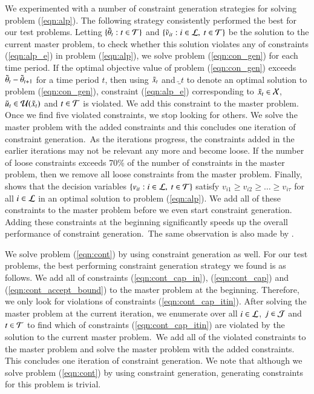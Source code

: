 We experimented with a number of constraint generation strategies for solving problem (\ref{eqn:alp}). The following strategy consistently performed the best for our test problems. Letting $\{ {\tilde \theta}_t : t \in {\cal T}\}$ and $\{{\tilde v}_{it} : i \in {\cal L},~ t \in {\cal T}\}$ be the solution to the current master problem, to check whether this solution violates any of constraints (\ref{eqn:alp_e}) in problem (\ref{eqn:alp}), we solve problem (\ref{eqn:con_gen}) for each time period. If the optimal objective value of problem (\ref{eqn:con_gen}) exceeds ${\tilde \theta}_t - {\tilde \theta}_{t+1}$ for a time period $t$, then using ${\tilde x}_t$ and $\utilde_t$ to denote an optimal solution to problem (\ref{eqn:con_gen}), constraint (\ref{eqn:alp_e}) corresponding to ${\tilde x}_t \in {\cal X}$, ${\tilde u}_t \in {\cal U}({\tilde x}_t)$ and $t \in {\cal T}$ is violated. We add this constraint to the master problem. Once we find five violated constraints, we stop looking for others. We solve the master problem with the added constraints and this concludes one iteration of constraint generation.~As the iterations progress, the constraints added in the earlier iterations may not be relevant any more and become loose. If the number of loose constraints exceeds 70\% of the number of constraints in the master problem, then we remove all loose constraints from the master problem.  Finally,  shows that the decision variables $\{ v_{it} : i \in {\cal L},~t \in {\cal T}\}$ satisfy $v_{i1} \geq v_{i2} \geq \ldots \geq v_{i\tau}$ for all $i \in {\cal L}$ in an optimal solution to problem \mbox{(\ref{eqn:alp})}. We add all of these constraints to the master problem before we even start constraint generation. Adding these constraints at the beginning significantly speeds up the overall performance of constraint generation.~The same observation is also made by .


We solve problem (\ref{eqn:cont}) by using constraint generation as well. For our test problems, the best performing constraint generation strategy we found is as follows. We add all of constraints (\ref{eqn:cont_cap_in}), (\ref{eqn:cont_cap}) and (\ref{eqn:cont_accept_bound}) to the master problem at the beginning. Therefore, we only look for violations of constraints (\ref{eqn:cont_cap_itin}). After solving the master problem at the current iteration, we enumerate over all $i \in {\cal L}$, $j \in {\cal J}$ and $t \in {\cal T}$ to find which of constraints (\ref{eqn:cont_cap_itin}) are violated by the solution to the current master problem.~We add all of the violated constraints to the master problem and solve the master problem with the added constraints. This concludes one iteration of constraint generation. We note that although we solve problem (\ref{eqn:cont}) by using constraint generation, generating constraints for this problem is trivial.


